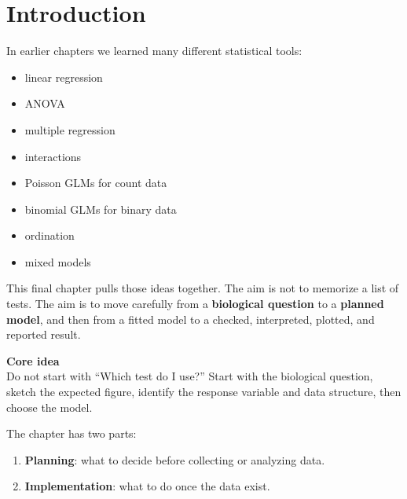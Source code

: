 \documentclass[
  letterpaper,
  8pt,
  a4paper]{book}
\providecommand{\tightlist}{%
  \setlength{\itemsep}{0pt}\setlength{\parskip}{0pt}}
\begin{document}
\section*{Introduction}\label{introduction-9}


In earlier chapters we learned many different statistical tools:

\begin{itemize}
\tightlist
\item
  linear regression
\item
  ANOVA
\item
  multiple regression
\item
  interactions
\item
  Poisson GLMs for count data
\item
  binomial GLMs for binary data
\item
  ordination
\item
  mixed models
\end{itemize}

This final chapter pulls those ideas together. The aim is not to
memorize a list of tests. The aim is to move carefully from a
\textbf{biological question} to a \textbf{planned model}, and then from
a fitted model to a checked, interpreted, plotted, and reported result.

\begin{tcolorbox}[enhanced jigsaw, arc=.35mm, bottomrule=.15mm, bottomtitle=1mm, breakable, colback=white, colbacktitle=quarto-callout-important-color!10!white, colframe=quarto-callout-important-color-frame, coltitle=black, left=2mm, leftrule=.75mm, opacityback=0, opacitybacktitle=0.6, rightrule=.15mm, title=\textcolor{quarto-callout-important-color}{\faExclamation}\hspace{0.5em}{Important}, titlerule=0mm, toprule=.15mm, toptitle=1mm]

\textbf{Core idea}\\
Do not start with ``Which test do I use?'' Start with the biological
question, sketch the expected figure, identify the response variable and
data structure, then choose the model.

\end{tcolorbox}

The chapter has two parts:

\begin{enumerate}
\def\labelenumi{\arabic{enumi}.}
\tightlist
\item
  \textbf{Planning}: what to decide before collecting or analyzing data.
\item
  \textbf{Implementation}: what to do once the data exist.
\end{enumerate}
\end{document}
